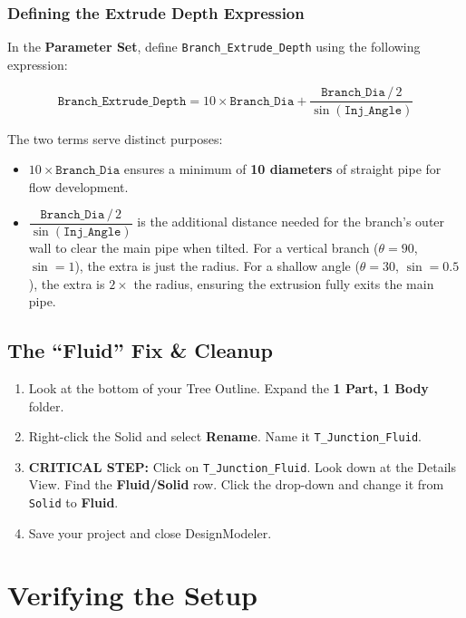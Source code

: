 \documentclass[12pt,a4paper]{report}
\begin{document}
\subsubsection*{Defining the Extrude Depth Expression}

In the \textbf{Parameter Set}, define \texttt{Branch\_Extrude\_Depth} using the following expression:

\begin{equation}
  \texttt{Branch\_Extrude\_Depth}
  = 10 \times \texttt{Branch\_Dia}
  + \frac{\texttt{Branch\_Dia}\,/\,2}{\sin(\texttt{Inj\_Angle})}
\end{equation}

The two terms serve distinct purposes:

\begin{itemize}
  \item $10 \times \texttt{Branch\_Dia}$ ensures a minimum of \textbf{10 diameters} of straight pipe for flow development.
  \item $\dfrac{\texttt{Branch\_Dia}\,/\,2}{\sin(\texttt{Inj\_Angle})}$ is the additional distance needed for the branch's outer wall to clear the main pipe when tilted. For a vertical branch ($\theta = 90$\textdegree, $\sin = 1$), the extra is just the radius. For a shallow angle ($\theta = 30$\textdegree, $\sin = 0.5$), the extra is $2\times$ the radius, ensuring the extrusion fully exits the main pipe.
\end{itemize}

\subsection{The ``Fluid'' Fix \& Cleanup}

\begin{enumerate}
  \item Look at the bottom of your Tree Outline. Expand the \textbf{1 Part, 1 Body} folder.
  \item Right-click the Solid and select \textbf{Rename}. Name it \texttt{T\_Junction\_Fluid}.
  \item \textbf{CRITICAL STEP:} Click on \texttt{T\_Junction\_Fluid}. Look down at the Details View. Find the \textbf{Fluid/Solid} row. Click the drop-down and change it from \texttt{Solid} to \textbf{Fluid}.
  \item Save your project and close DesignModeler.
\end{enumerate}


\section{Verifying the Setup}
\end{document}
